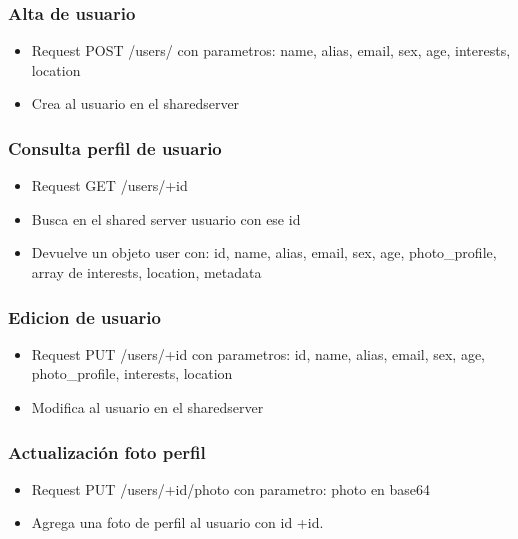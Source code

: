 \documentclass[letterpaper,10pt,english]{sphinxmanual}
\begin{document}
\subsubsection{Alta de usuario}
\label{manuals:alta-de-usuario}\begin{itemize}
\item {} 
Request POST /users/ con parametros: name, alias, email, sex, age, interests, location

\item {} 
Crea al usuario  en el sharedserver

\end{itemize}


\subsubsection{Consulta perfil de usuario}
\label{manuals:consulta-perfil-de-usuario}\begin{itemize}
\item {} 
Request GET /users/+id

\item {} 
Busca en el shared server usuario con ese id

\item {} 
Devuelve un objeto user con: id, name, alias, email, sex, age, photo\_profile, array de interests, location, metadata

\end{itemize}


\subsubsection{Edicion de usuario}
\label{manuals:edicion-de-usuario}\begin{itemize}
\item {} 
Request PUT /users/+id con parametros: id, name, alias, email, sex, age, photo\_profile, interests, location

\item {} 
Modifica al usuario  en el sharedserver

\end{itemize}


\subsubsection{Actualización foto perfil}
\label{manuals:actualizacion-foto-perfil}\begin{itemize}
\item {} 
Request PUT /users/+id/photo con parametro: photo en base64

\item {} 
Agrega una foto de perfil al usuario con id +id.

\end{itemize}
\end{document}

